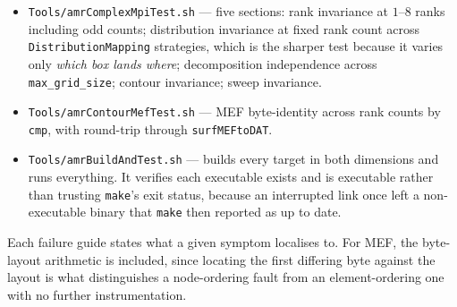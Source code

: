 \begin{itemize}[leftmargin=*]
\item \texttt{Tools/amrComplexMpiTest.sh} --- five sections: rank invariance at
  $1$--$8$ ranks including odd counts; distribution invariance at fixed rank
  count across \texttt{DistributionMapping} strategies, which is the sharper
  test because it varies only \emph{which box lands where}; decomposition
  independence across \texttt{max\_grid\_size}; contour invariance; sweep
  invariance.
\item \texttt{Tools/amrContourMefTest.sh} --- MEF byte-identity across rank
  counts by \texttt{cmp}, with round-trip through \texttt{surfMEFtoDAT}.
\item \texttt{Tools/amrBuildAndTest.sh} --- builds every target in both
  dimensions and runs everything. It verifies each executable exists and is
  executable rather than trusting \texttt{make}'s exit status, because an
  interrupted link once left a non-executable binary that \texttt{make} then
  reported as up to date.
\end{itemize}

Each failure guide states what a given symptom localises to. For MEF, the
byte-layout arithmetic is included, since locating the first differing byte
against the layout is what distinguishes a node-ordering fault from an
element-ordering one with no further instrumentation.
